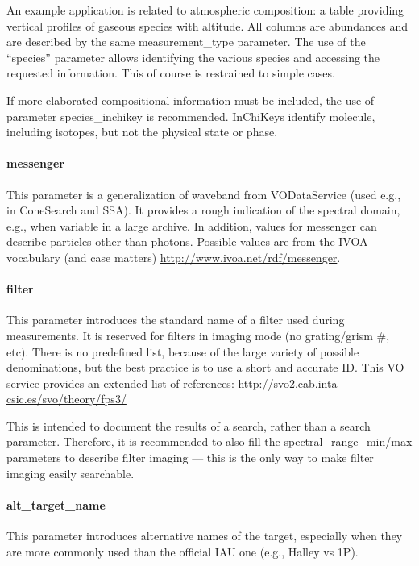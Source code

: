 \documentclass[11pt,a4paper]{ivoa}
\begin{document}
An example application is related to atmospheric composition:
a table providing vertical profiles of gaseous species with altitude.
All columns are abundances and are described by the same measurement\_type
parameter. The use of the ``species'' parameter allows identifying the
various species and accessing the requested information. This of course
is restrained to simple cases.

If more elaborated compositional information must be included, the use of
parameter species\_inchikey is recommended. InChiKeys identify molecule,
including isotopes, but not the physical state or phase.

\paragraph{messenger}

This parameter is a generalization of waveband from VODataService
(used e.g., in ConeSearch and SSA). It provides a rough indication
of the spectral domain, e.g., when variable in a large archive. In
addition, values for messenger can describe particles other than
photons. Possible values are from the IVOA vocabulary (and case matters)
\url{http://www.ivoa.net/rdf/messenger}.

\paragraph{filter}

This parameter introduces the standard name of a filter used during
measurements. It is reserved for filters in imaging mode (no
grating/grism \#, etc). There is no predefined list, because of the large
variety of possible denominations, but the best practice is to use a short
and accurate ID. This VO service provides an extended list of references:
\url{http://svo2.cab.inta-csic.es/svo/theory/fps3/}

This is intended to document the results of a search, rather than
a search parameter. Therefore, it is recommended to also fill the
spectral\_range\_min/max parameters to describe filter imaging --- this
is the only way to make filter imaging easily searchable.

\paragraph{alt\_target\_name}

This parameter introduces alternative names of the target, especially
when they are more commonly used than the official IAU one (e.g., Halley vs 1P).
\end{document}
